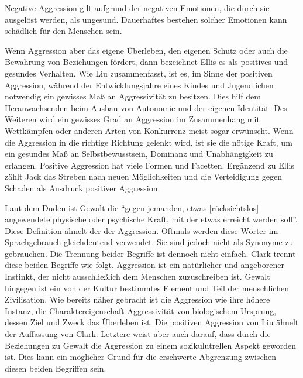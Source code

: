 Negative Aggression gilt 
aufgrund der negativen Emotionen, die durch sie ausgelöst werden, als ungesund. Dauerhaftes 
bestehen solcher Emotionen kann  schädlich für den Menschen sein. %

Wenn Aggression aber das eigene Überleben, den eigenen Schutz oder auch die Bewahrung 
von Beziehungen fördert, dann bezeichnet Ellis %
es als positives und gesundes Verhalten. Wie Liu %
zusammenfasst, ist es, im Sinne der positiven Aggression, während der Entwicklungsjahre eines 
Kindes und Jugendlichen notwendig ein gewisses Maß an Aggressivität zu besitzen. Dies hilf dem 
Heranwachsenden beim Ausbau von Autonomie und der eigenen Identität. Des Weiteren wird ein 
gewisses Grad an Aggression im Zusammenhang mit Wettkämpfen oder anderen Arten von Konkurrenz 
meist sogar erwünscht. Wenn die Aggression in die richtige Richtung gelenkt wird, ist sie die 
nötige Kraft, um ein gesundes Maß an Selbstbewusstsein, Dominanz und Unabhängigkeit zu erlangen.
Positive Aggression hat viele Formen und Facetten. Ergänzend zu Ellis %
zählt Jack %
das Streben nach neuen Möglichkeiten und die Verteidigung gegen Schaden als Ausdruck positiver 
Aggression.

Laut dem Duden ist Gewalt die \enquote{gegen jemanden, etwas [rücksichtslos] angewendete
physische oder psychische Kraft, mit der etwas erreicht werden soll}. %
Diese Definition ähnelt der der Aggression. Oftmals werden diese Wörter im Sprachgebrauch
gleichdeutend verwendet. Sie sind jedoch nicht als Synonyme zu gebrauchen. Die Trennung beider
Begriffe ist dennoch nicht einfach. Clark %
trennt diese beiden Begriffe wie folgt. Aggression ist ein natürlicher und angeborener Instinkt, 
der nicht ausschließlich dem Menschen zuzuschreiben ist. Gewalt hingegen ist ein von der Kultur
bestimmtes Element und Teil der menschlichen Zivilisation. Wie bereits näher gebracht ist die 
Aggression wie ihre höhere Instanz, die Charaktereigenschaft Aggressivität von biologischem 
Ursprung, dessen Ziel und Zweck das Überleben ist. %
Die positiven Aggression von Liu ähnelt der Auffassung von Clark. Letztere weist aber auch
darauf, dass durch die Beziehungen zu Gewalt die Aggression zu einem sozikulutrellen Aspekt
geworden ist. %
Dies kann ein möglicher Grund für die erschwerte Abgrenzung zwischen diesen beiden
Begriffen sein. 

